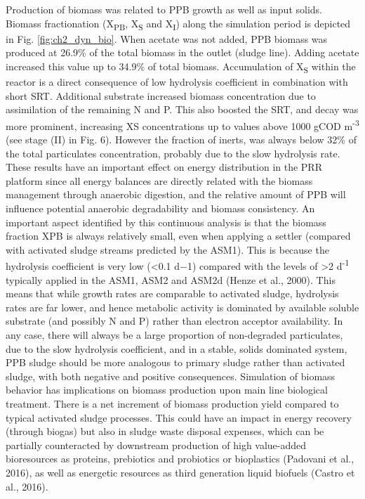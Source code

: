 \skippingparagraph
Production of biomass was related to PPB growth as well as input solids. Biomass fractionation (X\textsubscript{PB}, X\textsubscript{S} and X\textsubscript{I}) along the simulation period is depicted in Fig. \ref{fig:ch2_dyn_bio}. When acetate was not added, PPB biomass was produced at 26.9\% of the total biomass in the outlet (sludge line). Adding acetate increased this value up to 34.9\% of total biomass. Accumulation of X\textsubscript{S} within the reactor is a direct consequence of low hydrolysis coefficient in combination with short SRT. Additional substrate increased biomass concentration due to assimilation of the remaining N and P. This also boosted the SRT, and decay was more prominent, increasing XS concentrations up to values above 1000 gCOD m\textsuperscript{-3} (see stage (II) in Fig. 6). However the fraction of inerts, was always below 32\% of the total particulates concentration, probably due to the slow hydrolysis rate. These results have an important effect on energy distribution in the PRR platform since all energy balances are directly related with the biomass management through anaerobic digestion, and the relative amount of PPB will influence potential anaerobic degradability and biomass consistency. An important aspect identified by this continuous analysis is that the biomass fraction XPB is always relatively small, even when applying a settler (compared with activated sludge streams predicted by the ASM1). This is because the hydrolysis coefficient is very low (<0.1 d−1) compared with the levels of >2 d\textsuperscript{-1} typically applied in the ASM1, ASM2 and ASM2d \cite{Henze1987} (Henze et al., 2000). This means that while growth rates are comparable to activated sludge, hydrolysis rates are far lower, and hence metabolic activity is dominated by available soluble substrate (and possibly N and P) rather than electron acceptor availability. In any case, there will always be a large proportion of non-degraded particulates, due to the slow hydrolysis coefficient, and in a stable, solids dominated system, PPB sludge should be more analogous to primary sludge rather than activated sludge, with both negative and positive consequences.
\skippingparagraph
Simulation of biomass behavior has implications on biomass production upon main line biological treatment. There is a net increment of biomass production yield compared to typical activated sludge processes. This could have an impact in energy recovery (through biogas) but also in sludge waste disposal expenses, which can be partially counteracted by downstream production of high value-added bioresources as proteins, prebiotics and probiotics \cite{Matassa2015} or bioplastics (Padovani et al., 2016), as well as energetic resources as third generation liquid biofuels \cite{Castro2017}(Castro et al., 2016).


